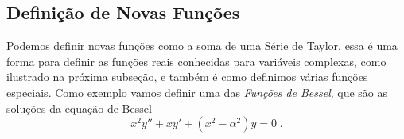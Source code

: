 \subsection{Definição de Novas Funções}

Podemos definir novas funções como a soma de uma Série de Taylor, essa é uma
forma para definir as funções reais conhecidas para variáveis complexas,
como ilustrado na próxima subseção,
e também é como definimos várias funções especiais. Como exemplo vamos
definir uma das \emph{Funções de Bessel},
que são as soluções da equação de Bessel
\begin{equation}
  \label{eq:bessel}
  x^2 y'' + xy' + (x^2-\alpha^2)y = 0 \;.
\end{equation}

